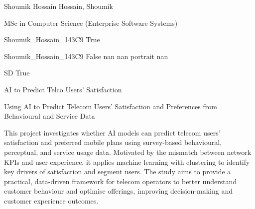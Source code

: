 \documentclass[twoside]{report}
\begin{document}
\begingroup{}\relax



\def\Key{Shoumik_Hossain_143C9}

{Shoumik Hossain}
{Hossain, Shoumik}

{MSc in Computer Science (Enterprise Software Systems)}

{Shoumik_Hossain_143C9}
{True}

{Shoumik_Hossain_143C9}
{False}
{nan}
{nan}
{portrait}
{nan}

{SD}
{True}

{AI to Predict Telco Users' Satisfaction}

{Using AI to Predict Telecom Users' Satisfaction and Preferences from Behavioural and Service Data}

{This project investigates whether AI models can predict telecom users' satisfaction and preferred mobile plans using survey-based behavioural, perceptual, and service usage data. Motivated by the mismatch between network KPIs and user experience, it applies machine learning with clustering to identify key drivers of satisfaction and segment users. The study aims to provide a practical, data-driven framework for telecom operators to better understand customer behaviour and optimise offerings, improving decision-making and customer experience outcomes.}
\end{document}
